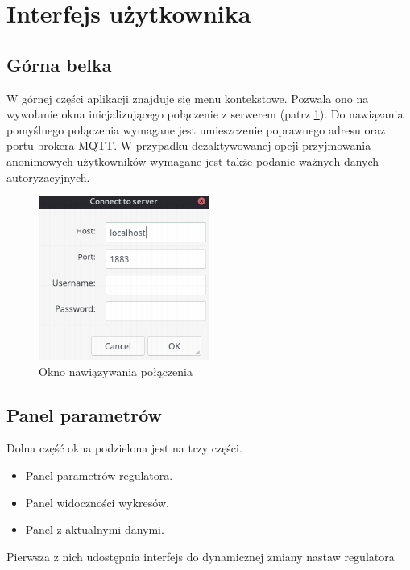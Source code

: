 \section{Interfejs użytkownika}
    
    \subsection{Górna belka}
        W górnej części aplikacji znajduje się menu kontekstowe. Pozwala ono na wywołanie okna inicjalizującego połączenie z serwerem (patrz \ref{fig:app_connect}). Do nawiązania pomyślnego połączenia wymagane jest umieszczenie poprawnego adresu oraz portu brokera MQTT. W przypadku dezaktywowanej opcji przyjmowania anonimowych użytkowników wymagane jest także podanie ważnych danych autoryzacyjnych.
        
        \begin{figure}[ht]
            \centering
            \includegraphics[width=0.5\textwidth]{img/app_connect.png}
            \caption{Okno nawiązywania połączenia}
            \label{fig:app_connect}
        \end{figure}
    
    
    \subsection{Panel parametrów}
        Dolna część okna podzielona jest na trzy części.
        
        \begin{itemize}
            \item Panel parametrów regulatora.
            \item Panel widoczności wykresów.
            \item Panel z aktualnymi danymi.
        \end{itemize}
        
        Pierwsza z nich udostępnia interfejs do dynamicznej zmiany nastaw regulatora 


